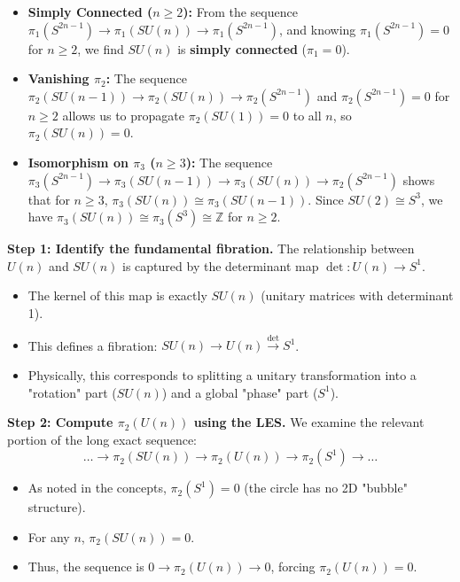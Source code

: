 \begin{solution}
\begin{itemize}
\begin{itemize}
\begin{itemize}
            \item \textbf{Simply Connected ($n \geq 2$):} From the sequence $\pi_1(S^{2n-1}) \to \pi_1(SU(n)) \to \pi_1(S^{2n-1})$, and knowing $\pi_1(S^{2n-1}) = 0$ for $n \geq 2$, we find $SU(n)$ is \textbf{simply connected} ($\pi_1 = 0$).
            \item \textbf{Vanishing $\pi_2$:} The sequence $\pi_2(SU(n-1)) \to \pi_2(SU(n)) \to \pi_2(S^{2n-1})$ and $\pi_2(S^{2n-1}) = 0$ for $n \geq 2$ allows us to propagate $\pi_2(SU(1)) = 0$ to all $n$, so \textbf{$\pi_2(SU(n)) = 0$}.
            \item \textbf{Isomorphism on $\pi_3$ ($n \geq 3$):} The sequence $\pi_3(S^{2n-1}) \to \pi_3(SU(n-1)) \to \pi_3(SU(n)) \to \pi_2(S^{2n-1})$ shows that for $n \geq 3$, $\pi_3(SU(n)) \cong \pi_3(SU(n-1))$. Since $SU(2) \cong S^3$, we have $\pi_3(SU(n)) \cong \pi_3(S^3) \cong \mathbb{Z}$ for $n \geq 2$.
        \end{itemize}
    \end{itemize}
\end{itemize}

\textbf{Step 1: Identify the fundamental fibration.}
The relationship between $U(n)$ and $SU(n)$ is captured by the determinant map $\det: U(n) \to S^1$. 
\begin{itemize}
    \item The kernel of this map is exactly $SU(n)$ (unitary matrices with determinant 1).
    \item This defines a fibration: $SU(n) \to U(n) \xrightarrow{\det} S^1$.
    \item Physically, this corresponds to splitting a unitary transformation into a "rotation" part ($SU(n)$) and a global "phase" part ($S^1$).
\end{itemize}

\textbf{Step 2: Compute $\pi_2(U(n))$ using the LES.}
We examine the relevant portion of the long exact sequence:
\[ \dots \to \pi_2(SU(n)) \to \pi_2(U(n)) \to \pi_2(S^1) \to \dots \]
\begin{itemize}
    \item As noted in the concepts, $\pi_2(S^1) = 0$ (the circle has no 2D "bubble" structure).
    \item For any $n$, $\pi_2(SU(n)) = 0$.
    \item Thus, the sequence is $0 \to \pi_2(U(n)) \to 0$, forcing \textbf{$\pi_2(U(n)) = 0$}.
\end{itemize}


\end{solution}
